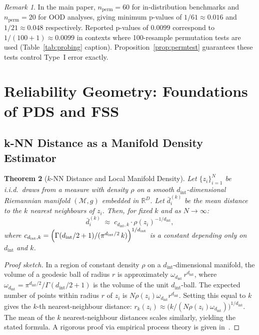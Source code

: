 \documentclass[12pt]{article}
\newtheorem{theorem}{Theorem}[section]
\theoremstyle{definition}
\theoremstyle{remark}
\newtheorem{remark}[theorem]{Remark}
\newcommand{\R}{\mathbb{R}}
\newcommand{\Mset}{\mathcal{M}}
\newcommand{\dint}{d_{\mathrm{int}}}
\begin{document}
\begin{remark}
In the main paper, $n_\mathrm{perm} = 60$ for in-distribution benchmarks
and $n_\mathrm{perm} = 20$ for OOD analyses, giving minimum p-values of
$1/61 \approx 0.016$ and $1/21 \approx 0.048$ respectively.
Reported p-values of $0.0099$ correspond to $1/(100+1) \approx 0.0099$
in contexts where 100-resample permutation tests are used (Table~\ref{tab:probing}
caption). Proposition~\ref{prop:permtest} guarantees these tests control
Type~I error exactly.
\end{remark}

\section{Reliability Geometry: Foundations of PDS and FSS}
\label{sec:reliability_theory}

\subsection{k-NN Distance as a Manifold Density Estimator}

\begin{theorem}[$k$-NN Distance and Local Manifold Density]
\label{thm:knn_density}
Let $\{z_i\}_{i=1}^N$ be i.i.d.\ draws from a measure with density $\rho$
on a smooth $\dint$-dimensional Riemannian manifold $(\Mset, g)$ embedded
in $\R^D$. Let $\bar{d}_i^{(k)}$ be the mean distance to the $k$ nearest
neighbours of $z_i$. Then, for fixed $k$ and as $N \to \infty$:
\[
  \bar{d}_i^{(k)} \;\approx\; c_{\dint,k} \cdot \rho(z_i)^{-1/\dint},
\]
where $c_{\dint,k} = \Bigl(\Gamma(\dint/2+1) / (\pi^{\dint/2}\,k)\Bigr)^{1/\dint}$
is a constant depending only on $\dint$ and $k$.
\end{theorem}

\begin{proof}[Proof sketch]
In a region of constant density $\rho$ on a $\dint$-dimensional manifold,
the volume of a geodesic ball of radius $r$ is approximately
$\omega_{\dint}\, r^{\dint}$, where $\omega_{\dint} = \pi^{\dint/2}/\Gamma(\dint/2+1)$
is the volume of the unit $\dint$-ball. The expected number of points within
radius $r$ of $z_i$ is $N\rho(z_i)\omega_{\dint} r^{\dint}$.
Setting this equal to $k$ gives the $k$-th nearest-neighbour distance:
$r_k(z_i) \approx \bigl(k/(N\rho(z_i)\omega_{\dint})\bigr)^{1/\dint}$.
The mean of the $k$ nearest-neighbour distances scales similarly, yielding
the stated formula. A rigorous proof via empirical process theory is given
in~\citet{penrose2011random}.
\end{proof}
\end{document}
